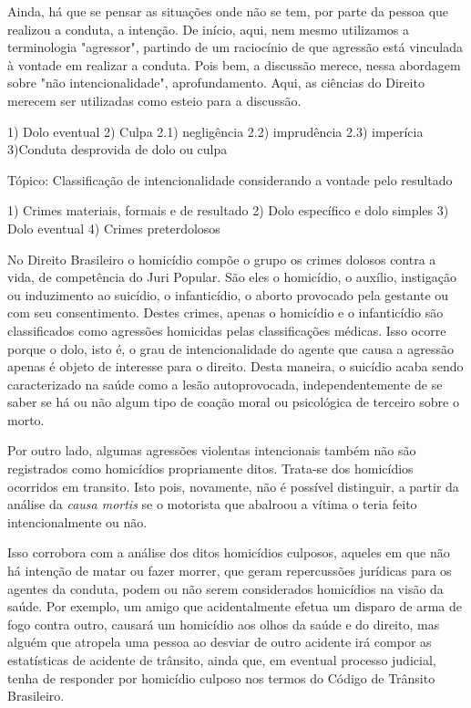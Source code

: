 Ainda, há que se pensar as situações onde não se tem, por parte da pessoa que realizou a conduta, a intenção. De início, aqui, nem mesmo utilizamos a terminologia "agressor", partindo de um raciocínio de que agressão está vinculada à vontade em realizar a conduta. Pois bem, a discussão merece, nessa abordagem sobre "não intencionalidade", aprofundamento. Aqui, as ciências do Direito merecem ser utilizadas como esteio para a discussão.

1) Dolo eventual
2) Culpa
2.1) negligência
2.2) imprudência
2.3) imperícia
3)Conduta desprovida de dolo ou culpa

Tópico: Classificação de intencionalidade considerando a vontade pelo resultado

1) Crimes materiais, formais e de resultado
2) Dolo específico e dolo simples
3) Dolo eventual
4) Crimes preterdolosos



No Direito Brasileiro o homicídio compõe o grupo os crimes dolosos contra a vida, de competência do Juri Popular. São eles o homicídio, o auxílio, instigação ou induzimento ao suicídio,   o infanticídio, o aborto provocado pela gestante ou com seu consentimento. Destes crimes, apenas o homicídio e o infanticídio são classificados como agressões homicidas pelas classificações médicas. Isso ocorre porque o dolo, isto é, o grau de intencionalidade do agente que causa a agressão apenas é objeto de interesse para o direito. Desta maneira, o suicídio acaba sendo caracterizado na saúde como a lesão autoprovocada, independentemente de se saber se há ou não algum tipo de coação moral ou psicológica de terceiro sobre o morto.


Por outro lado, algumas agressões violentas intencionais também não são registrados como homicídios propriamente ditos. Trata-se dos homicídios ocorridos em transito. Isto pois, novamente, não é possível distinguir, a partir da análise da \textit{causa mortis} se o motorista que abalroou a vítima o teria feito intencionalmente ou não.

Isso corrobora com a análise dos ditos homicídios culposos, aqueles em que não há intenção de matar ou fazer morrer, que geram repercussões jurídicas para os agentes da conduta, podem ou não serem considerados homicídios na visão da saúde. Por exemplo, um amigo que acidentalmente efetua um disparo de arma de fogo contra outro, causará um homicídio aos olhos da saúde e do direito, mas alguém que atropela uma pessoa ao desviar de outro acidente irá compor as estatísticas de acidente de trânsito, ainda que, em eventual processo judicial, tenha de responder por homicídio culposo nos termos do Código de Trânsito Brasileiro. 


